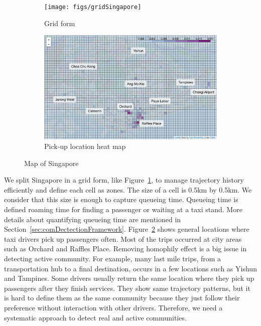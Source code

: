 \documentclass{article}
\begin{document}
\begin{figure} [h] 

\centering
\begin{subfigure}{\linewidth}
  \centering
  \texttt{[image: figs/gridSingapore]}
  \caption{Grid form}
  \label{fig:gridSingapore}
\end{subfigure}

\begin{subfigure}{\linewidth}
  \centering
  \includegraphics[width=0.95\linewidth]{figs/locationHeatMap}
  \caption{Pick-up location heat map}
  \label{fig:locationHeatMap}
\end{subfigure}

\caption{Map of Singapore}
\label{fig:mapSingapore}
\end{figure}


We split Singapore in a grid form, like Figure~\ref{fig:gridSingapore}, to manage trajectory history efficiently and define each cell as zones. The size of a cell is 0.5km by 0.5km. We consider that this size is enough to capture queueing time. Queueing time is defined roaming time for finding a passenger or waiting at a taxi stand. More details about quantifying queueing time are mentioned in Section~\ref{sec:comDectectionFramework}. Figure~\ref{fig:locationHeatMap} shows general locations where taxi drivers pick up passengers often. Most of the trips occurred at city areas such as Orchard and Raffles Place. Removing homophily effect is a big issue in detecting active community. For example, many last mile trips, from a transportation hub to a final destination, occurs in a few locations such as Yishun and Tampines. Some drivers usually return the same location where they pick up passengers after they finish services. They show same trajectory patterns, but it is hard to define them as the same community because they just follow their preference without interaction with other drivers. Therefore, we need a systematic approach to detect real and active communities.
\end{document}
